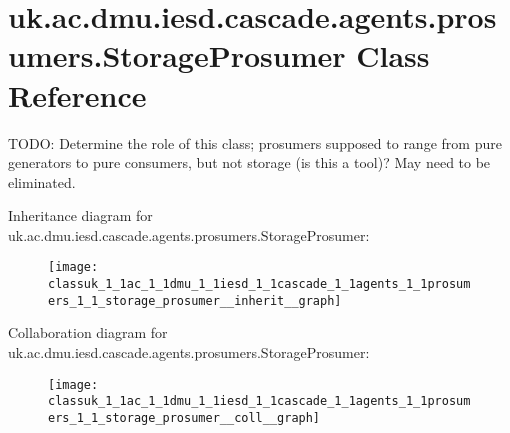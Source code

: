 \hypertarget{classuk_1_1ac_1_1dmu_1_1iesd_1_1cascade_1_1agents_1_1prosumers_1_1_storage_prosumer}{\section{uk.\-ac.\-dmu.\-iesd.\-cascade.\-agents.\-prosumers.\-Storage\-Prosumer Class Reference}
\label{classuk_1_1ac_1_1dmu_1_1iesd_1_1cascade_1_1agents_1_1prosumers_1_1_storage_prosumer}
}


T\-O\-D\-O\-: Determine the role of this class; prosumers supposed to range from pure generators to pure consumers, but not storage (is this a tool)? May need to be eliminated.  




Inheritance diagram for uk.\-ac.\-dmu.\-iesd.\-cascade.\-agents.\-prosumers.\-Storage\-Prosumer\-:\nopagebreak
\begin{figure}[H]
\begin{center}
\leavevmode
\texttt{[image: classuk\_1\_1ac\_1\_1dmu\_1\_1iesd\_1\_1cascade\_1\_1agents\_1\_1prosumers\_1\_1\_storage\_prosumer\_\_inherit\_\_graph]}
\end{center}
\end{figure}


Collaboration diagram for uk.\-ac.\-dmu.\-iesd.\-cascade.\-agents.\-prosumers.\-Storage\-Prosumer\-:\nopagebreak
\begin{figure}[H]
\begin{center}
\leavevmode
\texttt{[image: classuk\_1\_1ac\_1\_1dmu\_1\_1iesd\_1\_1cascade\_1\_1agents\_1\_1prosumers\_1\_1\_storage\_prosumer\_\_coll\_\_graph]}
\end{center}
\end{figure}
